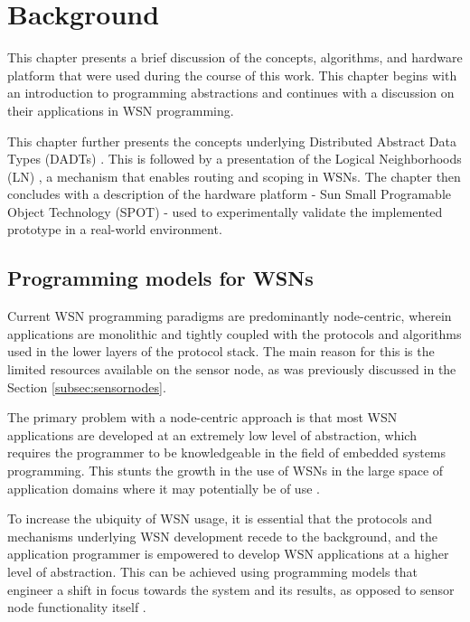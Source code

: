 \chapter{Background} \label{chap:background}

This chapter presents a brief discussion of the concepts, algorithms, and 
hardware platform that were used during the course of this work. This
chapter begins with an introduction to programming abstractions and continues
with a discussion on their applications in WSN programming.

This chapter further presents the concepts underlying Distributed Abstract Data
Types (DADTs) \cite{migliavacca_DADT:2006}. This is followed by a presentation of
the Logical Neighborhoods (LN) \cite{mottola_LNScoping:2006}, a mechanism that
enables routing and scoping in WSNs. The chapter then concludes with a
description of the hardware platform - Sun Small Programable Object Technology
(SPOT) \cite{simon_squawk:2006} - used to experimentally validate the implemented
prototype in a real-world environment.

\section {Programming models for WSNs}

Current WSN programming paradigms are predominantly node-centric, wherein
applications are monolithic and tightly coupled with the protocols and algorithms
used in the lower layers of the protocol stack. 
The main reason for this is the limited resources available on the sensor node, as
was previously discussed in the Section \ref{subsec:sensornodes}.

The primary problem with a node-centric approach is that most WSN applications
are developed at an extremely low level of abstraction, which requires the programmer to be knowledgeable in the field of
embedded systems programming. This stunts the growth in the use of WSNs in the
large space of application domains where it may potentially be of use
\cite{mottola_middleware:2008}. 

To increase the ubiquity of WSN
usage, it is essential that the protocols and mechanisms underlying WSN
development recede to the background, and the application programmer is
empowered to develop WSN applications at a higher level of abstraction. This
can be achieved using programming models that engineer a shift in focus
towards the system and its results, as opposed to sensor node functionality
itself \cite{mottola_middleware:2008}. 

